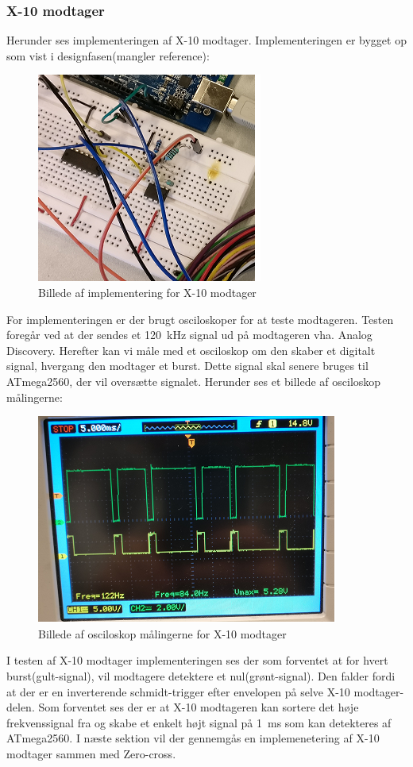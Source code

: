 \documentclass[11pt]{article}
\begin{document}
\subsubsection{X-10 modtager}
Herunder ses implementeringen af X-10 modtager. Implementeringen er bygget op som vist i designfasen(mangler reference):
\begin{figure}[H]
	\centering
	\includegraphics[scale = 1]{X-10modtager-imp}	
	\caption{Billede af implementering for X-10 modtager}
	\label{fig:impX10mod}
\end{figure}
For implementeringen er der brugt osciloskoper for at teste modtageren. Testen foregår ved at der sendes et \SI{120}{\kilo\hertz} signal ud på modtageren vha. Analog Discovery. Herefter kan vi måle med et osciloskop om den skaber et digitalt signal, hvergang den modtager et burst. Dette signal skal senere bruges til ATmega2560, der vil oversætte signalet. Herunder ses et billede af osciloskop målingerne:
\begin{figure}[H]
	\centering
	\includegraphics[scale = 1]{X-10modtager-osc}		
	\caption{Billede af osciloskop målingerne for X-10 modtager}
	\label{bil:oscmodtager}
\end{figure}
I testen af X-10 modtager implementeringen ses der som forventet at for hvert burst(gult-signal), vil modtagere detektere et nul(grønt-signal). Den falder fordi at der er en inverterende schmidt-trigger efter envelopen på selve X-10 modtager-delen. Som forventet ses der er at X-10 modtageren kan sortere det høje frekvenssignal fra og skabe et enkelt højt signal på \SI{1}{\milli\second} som kan detekteres af ATmega2560. I næste sektion vil der gennemgås en implemenetering af X-10 modtager sammen med Zero-cross.
\end{document}
